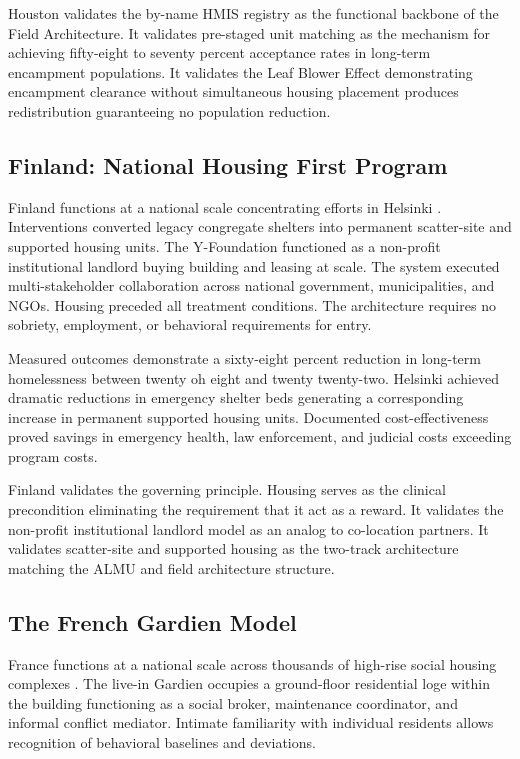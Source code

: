 \documentclass[12pt, letterpaper]{article}
\begin{document}
Houston validates the by-name HMIS registry as the functional backbone of the Field Architecture. It validates pre-staged unit matching as the mechanism for achieving fifty-eight to seventy percent acceptance rates in long-term encampment populations. It validates the Leaf Blower Effect demonstrating encampment clearance without simultaneous housing placement produces redistribution guaranteeing no population reduction.

\subsection{Finland: National Housing First Program}

Finland functions at a national scale concentrating efforts in Helsinki \citep{finland_housing_first_2023}. Interventions converted legacy congregate shelters into permanent scatter-site and supported housing units. The Y-Foundation functioned as a non-profit institutional landlord buying building and leasing at scale. The system executed multi-stakeholder collaboration across national government, municipalities, and NGOs. Housing preceded all treatment conditions. The architecture requires no sobriety, employment, or behavioral requirements for entry.

Measured outcomes demonstrate a sixty-eight percent reduction in long-term homelessness between twenty oh eight and twenty twenty-two. Helsinki achieved dramatic reductions in emergency shelter beds generating a corresponding increase in permanent supported housing units. Documented cost-effectiveness proved savings in emergency health, law enforcement, and judicial costs exceeding program costs.

Finland validates the governing principle. Housing serves as the clinical precondition eliminating the requirement that it act as a reward. It validates the non-profit institutional landlord model as an analog to co-location partners. It validates scatter-site and supported housing as the two-track architecture matching the ALMU and field architecture structure.

\subsection{The French Gardien Model}

France functions at a national scale across thousands of high-rise social housing complexes \citep{harvard_gsd_gardien, tu_eindhoven_2024}. The live-in Gardien occupies a ground-floor residential loge within the building functioning as a social broker, maintenance coordinator, and informal conflict mediator. Intimate familiarity with individual residents allows recognition of behavioral baselines and deviations.
\end{document}
